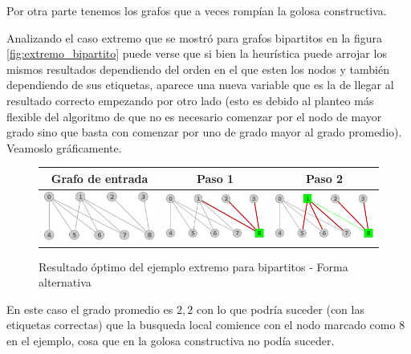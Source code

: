 Por otra parte tenemos los grafos que a veces romp\'ian la
golosa constructiva.

Analizando el caso extremo que se mostr\'o para grafos bipartitos
en la figura \ref{fig:extremo_bipartito} puede verse que si bien
la heur\'istica puede arrojar los mismos resultados dependiendo 
del orden en el que esten los nodos y tambi\'en dependiendo de 
sus etiquetas, aparece una nueva variable que es la de llegar al
resultado correcto empezando por otro lado (esto es debido 
al planteo m\'as flexible del algoritmo de que no es necesario
comenzar por el nodo de mayor grado sino que basta con comenzar
por uno de grado mayor al grado promedio).
Veamoslo gr\'aficamente.

\begin{figure}[H]
\caption{Resultado \'optimo del ejemplo extremo para bipartitos - 
Forma alternativa}
\begin{center}
		\begin{tabular}{|c||c||c|}
		\hline
		Grafo de entrada & Paso 1 & Paso 2 \\ 
			\hline
			\includegraphics[scale = 0.2]{img/ej3/busqueda_local/k5,4Nocompleto_st0.png} &
			\includegraphics[scale = 0.2]{img/ej3/busqueda_local/k5,4Nocompleto_st1.png} & 
			\includegraphics[scale = 0.2]{img/ej3/busqueda_local/k5,4Nocompleto_st2.png} \\
		\hline
		\end{tabular}
	\end{center}
\end{figure}
En este caso el grado promedio es $2,2$ con lo que podr\'ia suceder 
(con las etiquetas correctas) que la busqueda local comience con el
nodo marcado como $8$ en el ejemplo, cosa que en la golosa 
constructiva no pod\'ia suceder.

